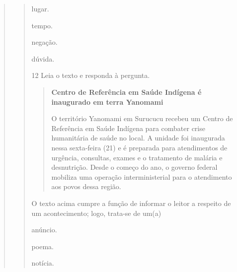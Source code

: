 \begin{escolha}
\begin{escolha}
\begin{escolha}
\begin{quote}
\begin{quote}
\begin{escolha}
  \item lugar.

  \item tempo.

  \item negação.

  \item dúvida.
\end{escolha}


\num{12} Leia o texto e responda à pergunta.

\begin{quote}
\textbf{Centro de Referência em Saúde Indígena é inaugurado em terra
Yanomami}

O território Yanomami em Surucucu recebeu um Centro de Referência em
Saúde Indígena para combater crise humanitária de saúde no local. A
unidade foi inaugurada nessa sexta-feira (21) e é preparada para
atendimentos de urgência, consultas, exames e o tratamento de malária e
desnutrição. Desde o começo do ano, o governo federal mobiliza uma
operação interministerial para o atendimento aos povos dessa região.
\end{quote}


O texto acima cumpre a função de informar o leitor a respeito de um
acontecimento; logo, trata-se de um(a)

\begin{escolha}
  \item anúncio.

  \item poema.

  \item notícia.


\end{escolha}
\end{quote}
\end{quote}
\end{escolha}
\end{escolha}
\end{escolha}
